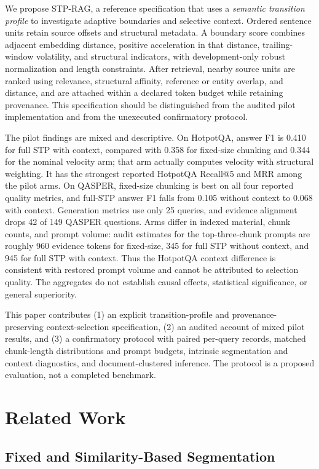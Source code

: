 \documentclass[10pt]{article}
\begin{document}
We propose STP-RAG, a reference specification that uses a \emph{semantic transition profile} to investigate adaptive boundaries and selective context. Ordered sentence units retain source offsets and structural metadata. A boundary score combines adjacent embedding distance, positive acceleration in that distance, trailing-window volatility, and structural indicators, with development-only robust normalization and length constraints. After retrieval, nearby source units are ranked using relevance, structural affinity, reference or entity overlap, and distance, and are attached within a declared token budget while retaining provenance. This specification should be distinguished from the audited pilot implementation and from the unexecuted confirmatory protocol.

The pilot findings are mixed and descriptive. On HotpotQA, answer F1 is 0.410 for full STP with context, compared with 0.358 for fixed-size chunking and 0.344 for the nominal velocity arm; that arm actually computes velocity with structural weighting. It has the strongest reported HotpotQA Recall@5 and MRR among the pilot arms. On QASPER, fixed-size chunking is best on all four reported quality metrics, and full-STP answer F1 falls from 0.105 without context to 0.068 with context. Generation metrics use only 25 queries, and evidence alignment drops 42 of 149 QASPER questions. Arms differ in indexed material, chunk counts, and prompt volume: audit estimates for the top-three-chunk prompts are roughly 960 evidence tokens for fixed-size, 345 for full STP without context, and 945 for full STP with context. Thus the HotpotQA context difference is consistent with restored prompt volume and cannot be attributed to selection quality. The aggregates do not establish causal effects, statistical significance, or general superiority.

This paper contributes (1) an explicit transition-profile and provenance-preserving context-selection specification, (2) an audited account of mixed pilot results, and (3) a confirmatory protocol with paired per-query records, matched chunk-length distributions and prompt budgets, intrinsic segmentation and context diagnostics, and document-clustered inference. The protocol is a proposed evaluation, not a completed benchmark.

\section{Related Work}

\subsection{Fixed and Similarity-Based Segmentation}
\end{document}
